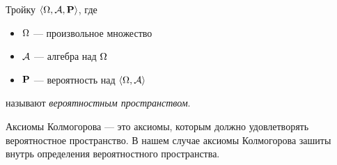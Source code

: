 \begin{definition}
	Тройку $\langle \Omega, \mathcal{A}, \mathbf{P} \rangle$, где
	\begin{itemize}
		\item $\Omega$ --- произвольное множество
		\item $\mathcal{A}$ --- \gm алгебра над $\Omega$
		\item $\mathbf{P}$ --- вероятность над $\langle \Omega, \mathcal{A} \rangle$
	\end{itemize}
	называют {\it вероятностным пространством}.
\end{definition}

Аксиомы Колмогорова --- это аксиомы, которым должно удовлетворять вероятностное пространство. В нашем случае аксиомы Колмогорова зашиты внутрь определения вероятностного пространства.
